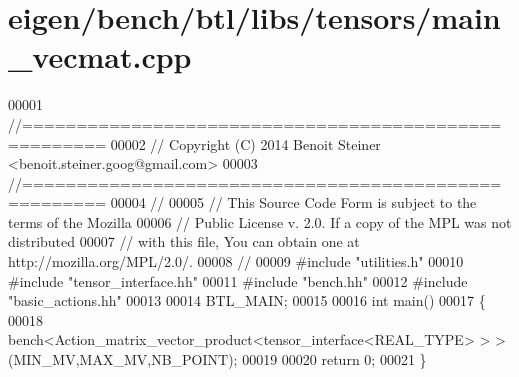 \hypertarget{eigen_2bench_2btl_2libs_2tensors_2main__vecmat_8cpp_source}{}\section{eigen/bench/btl/libs/tensors/main\+\_\+vecmat.cpp}
\label{eigen_2bench_2btl_2libs_2tensors_2main__vecmat_8cpp_source}

\begin{DoxyCode}
00001 \textcolor{comment}{//=====================================================}
00002 \textcolor{comment}{// Copyright (C) 2014 Benoit Steiner <benoit.steiner.goog@gmail.com>}
00003 \textcolor{comment}{//=====================================================}
00004 \textcolor{comment}{//}
00005 \textcolor{comment}{// This Source Code Form is subject to the terms of the Mozilla}
00006 \textcolor{comment}{// Public License v. 2.0. If a copy of the MPL was not distributed}
00007 \textcolor{comment}{// with this file, You can obtain one at http://mozilla.org/MPL/2.0/.}
00008 \textcolor{comment}{//}
00009 \textcolor{preprocessor}{#include "utilities.h"}
00010 \textcolor{preprocessor}{#include "tensor\_interface.hh"}
00011 \textcolor{preprocessor}{#include "bench.hh"}
00012 \textcolor{preprocessor}{#include "basic\_actions.hh"}
00013 
00014 BTL\_MAIN;
00015 
00016 \textcolor{keywordtype}{int} main()
00017 \{
00018   bench<Action\_matrix\_vector\_product<tensor\_interface<REAL\_TYPE> > >(MIN\_MV,MAX\_MV,NB\_POINT);
00019 
00020   \textcolor{keywordflow}{return} 0;
00021 \}
\end{DoxyCode}
